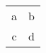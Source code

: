 \documentclass[11pt]{isuthesis}
\begin{document}
\begin{table}
    \begin{tabular}{c|c}
        a&b\\ 
        c&d
    \end{tabular}
\end{table}
\end{document}
